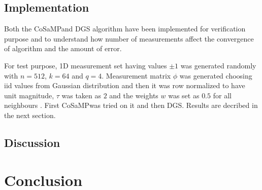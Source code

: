 \documentclass[12pt]{article}
\theoremstyle{definition}
\def\cosamp{CoSaMP\hspace{0.1in}}
\begin{document}
  \subsection{Implementation}
  Both the \cosamp and DGS algorithm have been implemented for verification purpose and to understand how 
  number of measurements affect the convergence of algorithm and the amount of error.
  
  \par For test purpose, 1D measurement set having values $\pm 1$ was generated randomly with $n=512$, $k=64$ and $q=4$.
  Measurement matrix $\phi$ was generated choosing iid values from Gaussian distribution and then it was row normalized
  to have unit magnitude, $\tau$ was taken as $2$ and the weights $w$ was set as $0.5$ for all neighbours \cite{Huang-DGS}.
  First \cosamp was tried on it and then DGS. Results are decribed in the next section.
  \subsection{Discussion}
  
\section{Conclusion}


\end{document}
